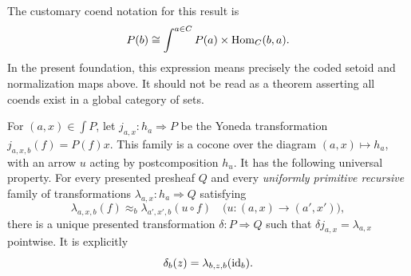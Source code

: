 The customary coend notation for this result is
\[
 P(b)\cong\int^{a\in C}P(a)\times\operatorname{Hom}_C(b,a).
\]
In the present foundation, this expression means precisely the coded
setoid and normalization maps above.  It should not be read as a theorem
asserting all coends exist in a global category of sets.

\begin{theorem}
\label{thm:density-cocone}
For $(a,x)\in\int P$, let $j_{a,x}:h_a\Rightarrow P$ be the Yoneda
transformation $j_{a,x,b}(f)=P(f)x$.  This family is a cocone over the diagram
$(a,x)\mapsto h_a$, with an arrow $u$ acting by postcomposition $h_u$.
It has the following universal property.  For every presented presheaf $Q$
and every \emph{uniformly primitive recursive} family of transformations
$\lambda_{a,x}:h_a\Rightarrow Q$ satisfying
\begin{equation}
 \lambda_{a,x,b}(f)\approx_b
 \lambda_{a',x',b}(u\circ f)
 \quad\bigl(u:(a,x)\to(a',x')\bigr),
 \label{eq:density-cocone}
\end{equation}
there is a unique presented transformation $\delta:P\Rightarrow Q$ such
that $\delta j_{a,x}=\lambda_{a,x}$ pointwise.  It is explicitly
\begin{equation}
 \delta_b(z)=\lambda_{b,z,b}(\operatorname{id}_b).
 \label{eq:density-mediator}
\end{equation}
\end{theorem}
